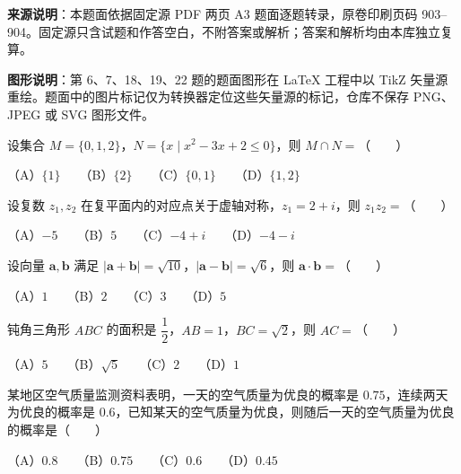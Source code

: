 


\begin{gktip}
\textbf{来源说明}：本题面依据固定源 PDF 两页 A3 题面逐题转录，原卷印刷页码 903–904。固定源只含试题和作答空白，不附答案或解析；答案和解析均由本库独立复算。

\textbf{图形说明}：第 6、7、18、19、22 题的题面图形在 LaTeX 工程中以 TikZ 矢量源重绘。题面中的图片标记仅为转换器定位这些矢量源的标记，仓库不保存 PNG、JPEG 或 SVG 图形文件。
\end{gktip}


\begin{question}
设集合 $M=\{0,1,2\}$，$N=\{x\mid x^2-3x+2\leqslant0\}$，则 $M\cap N=$\mbox{（　　）}

（A）$\{1\}$　　（B）$\{2\}$　　（C）$\{0,1\}$　　（D）$\{1,2\}$

\end{question}
\begin{question}
设复数 $z_1,z_2$ 在复平面内的对应点关于虚轴对称，$z_1=2+i$，则 $z_1z_2=$\mbox{（　　）}

（A）$-5$　　（B）$5$　　（C）$-4+i$　　（D）$-4-i$

\end{question}
\begin{question}
设向量 $\boldsymbol a,\boldsymbol b$ 满足 $|\boldsymbol a+\boldsymbol b|=\sqrt{10}$，$|\boldsymbol a-\boldsymbol b|=\sqrt6$，则 $\boldsymbol a\cdot\boldsymbol b=$\mbox{（　　）}

（A）$1$　　（B）$2$　　（C）$3$　　（D）$5$

\end{question}
\begin{question}
钝角三角形 $ABC$ 的面积是 $\dfrac12$，$AB=1$，$BC=\sqrt2$，则 $AC=$\mbox{（　　）}

（A）$5$　　（B）$\sqrt5$　　（C）$2$　　（D）$1$

\end{question}
\begin{question}
某地区空气质量监测资料表明，一天的空气质量为优良的概率是 $0.75$，连续两天为优良的概率是 $0.6$，已知某天的空气质量为优良，则随后一天的空气质量为优良的概率是\mbox{（　　）}

（A）$0.8$　　（B）$0.75$　　（C）$0.6$　　（D）$0.45$

\Needspace{0.4\textheight}
\end{question}
